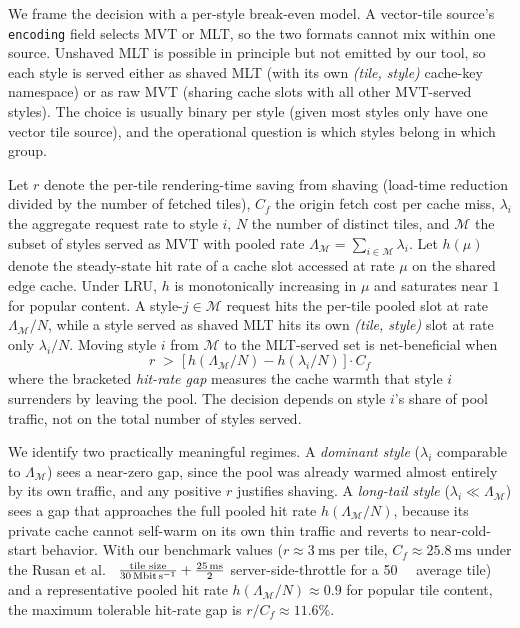 We frame the decision with a per-style break-even model.
A vector-tile source's \texttt{encoding} field selects \ac{MVT} or \ac{MLT}, so the two formats cannot mix within one source.
Unshaved \ac{MLT} is possible in principle but not emitted by our tool, so each style is served either as shaved \ac{MLT} (with its own \emph{(tile, style)} cache-key namespace) or as raw \ac{MVT} (sharing cache slots with all other \ac{MVT}-served styles).
The choice is usually binary per style (given most styles only have one vector tile source), and the operational question is which styles belong in which group.

Let $r$ denote the per-tile rendering-time saving from shaving (load-time reduction divided by the number of fetched tiles), $C_f$ the origin fetch cost per cache miss, $\lambda_i$ the aggregate request rate to style $i$, $N$ the number of distinct tiles, and $\mathcal{M}$ the subset of styles served as \ac{MVT} with pooled rate $\Lambda_\mathcal{M} = \sum_{i \in \mathcal{M}} \lambda_i$.
Let $h(\mu)$ denote the steady-state hit rate of a cache slot accessed at rate $\mu$ on the shared edge cache.
Under \ac{LRU}, $h$ is monotonically increasing in $\mu$ and saturates near $1$ for popular content.
A style-$j \in \mathcal{M}$ request hits the per-tile pooled slot at rate $\Lambda_\mathcal{M}/N$, while a style served as shaved \ac{MLT} hits its own \emph{(tile, style)} slot at rate only $\lambda_i/N$.
Moving style $i$ from $\mathcal{M}$ to the \ac{MLT}-served set is net-beneficial when
\[
    r \;>\; \big[\, h(\Lambda_\mathcal{M}/N) - h(\lambda_i/N) \,\big] \cdot C_f
\]
where the bracketed \emph{hit-rate gap} measures the cache warmth that style $i$ surrenders by leaving the pool.
The decision depends on style $i$'s share of pool traffic, not on the total number of styles served.

We identify two practically meaningful regimes.
A \emph{dominant style} ($\lambda_i$ comparable to $\Lambda_\mathcal{M}$) sees a near-zero gap, since the pool was already warmed almost entirely by its own traffic, and any positive $r$ justifies shaving.
A \emph{long-tail style} ($\lambda_i \ll \Lambda_\mathcal{M}$) sees a gap that approaches the full pooled hit rate $h(\Lambda_\mathcal{M}/N)$, because its private cache cannot self-warm on its own thin traffic and reverts to near-cold-start behavior.
With our benchmark values ($r \approx \qty{3}{\milli\second}$ per tile, $C_f \approx \qty{25.8}{\milli\second}$ under the Rusan et al.~\cite{rusanAssessmentPacketLatency2015} $\frac{\text{tile size}}{\qty{30}{\mega\bit\per\second}} + \frac{\qty{25}{\milli\second}}{2}$ server-side-throttle for a \qty{50}{\kilo\byte} average tile) and a representative pooled hit rate $h(\Lambda_\mathcal{M}/N) \approx 0.9$ for popular tile content, the maximum tolerable hit-rate gap is $r/C_f \approx 11.6\%$.

